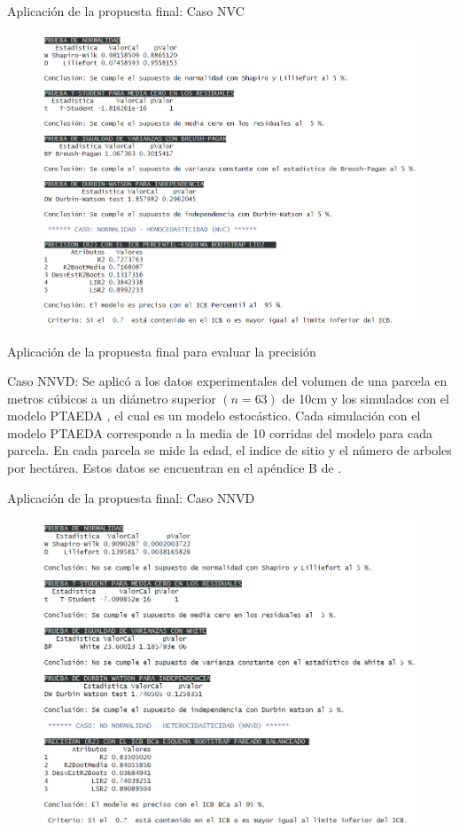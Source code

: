 \documentclass[serif, aspectratio=169]{beamer}
\begin{document}
\begin{frame}{Aplicación de la propuesta final: Caso NVC}
	\begin{figure}[ht!]
		\centering 
		\includegraphics[width=0.65\linewidth]{recurso/Uso_NVC_PropuestaFinal.png} 
		\label{fig:final_NVC_resultados}
	\end{figure}
\end{frame}



\begin{frame}{Aplicación de la propuesta final para evaluar la precisión}
	\begin{exampleblock}{Caso NNVD:}
		Se aplicó a los datos experimentales del volumen de una parcela en metros cúbicos a un diámetro superior $(n = 63)$ de 10cm y los simulados con el modelo PTAEDA \parencite{chung-1987}, el cual es un modelo estocástico. Cada simulación con el modelo PTAEDA corresponde a la media de 10 corridas del modelo para cada parcela. En cada parcela se mide la edad, el indice de sitio y el número de arboles por hectárea. Estos datos se encuentran en el apéndice B de \textcite{balam-2012}.
	\end{exampleblock}
\end{frame}


\begin{frame}{Aplicación de la propuesta final: Caso NNVD}
	\begin{figure}[ht!]
		\centering 
		\includegraphics[width=0.62\linewidth]{recurso/Uso_NNVD_PropuestaFinal.png} 
		\label{fig:final_NNVD_resultados}
	\end{figure}
\end{frame}
\end{document}
